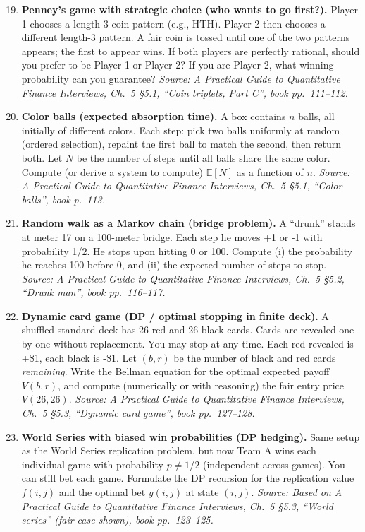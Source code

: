 \documentclass[11pt]{article}
\begin{document}
\begin{enumerate}[leftmargin=*, itemsep=0.9em]
\setcounter{enumi}{18}

\item \textbf{Penney's game with strategic choice (who wants to go first?).}  
Player 1 chooses a length-3 coin pattern (e.g., HTH). Player 2 then chooses a different length-3 pattern. A fair coin is tossed until one of the two patterns appears; the first to appear wins. If both players are perfectly rational, should you prefer to be Player 1 or Player 2? If you are Player 2, what winning probability can you guarantee?  
\textit{Source: A Practical Guide to Quantitative Finance Interviews, Ch.\ 5 \S5.1, ``Coin triplets, Part C'', book pp.\ 111--112.}

\item \textbf{Color balls (expected absorption time).}  
A box contains $n$ balls, all initially of different colors. Each step: pick two balls uniformly at random (ordered selection), repaint the first ball to match the second, then return both. Let $N$ be the number of steps until all balls share the same color. Compute (or derive a system to compute) $\mathbb{E}[N]$ as a function of $n$.  
\textit{Source: A Practical Guide to Quantitative Finance Interviews, Ch.\ 5 \S5.1, ``Color balls'', book p.\ 113.}

\item \textbf{Random walk as a Markov chain (bridge problem).}  
A ``drunk'' stands at meter 17 on a 100-meter bridge. Each step he moves +1 or -1 with probability 1/2. He stops upon hitting 0 or 100. Compute (i) the probability he reaches 100 before 0, and (ii) the expected number of steps to stop.  
\textit{Source: A Practical Guide to Quantitative Finance Interviews, Ch.\ 5 \S5.2, ``Drunk man'', book pp.\ 116--117.}

\item \textbf{Dynamic card game (DP / optimal stopping in finite deck).}  
A shuffled standard deck has 26 red and 26 black cards. Cards are revealed one-by-one without replacement. You may stop at any time. Each red revealed is +\$1, each black is -\$1. Let $(b,r)$ be the number of black and red cards \emph{remaining}. Write the Bellman equation for the optimal expected payoff $V(b,r)$, and compute (numerically or with reasoning) the fair entry price $V(26,26)$.  
\textit{Source: A Practical Guide to Quantitative Finance Interviews, Ch.\ 5 \S5.3, ``Dynamic card game'', book pp.\ 127--128.}

\item \textbf{World Series with biased win probabilities (DP hedging).}  
Same setup as the World Series replication problem, but now Team A wins each individual game with probability $p\neq 1/2$ (independent across games). You can still bet each game. Formulate the DP recursion for the replication value $f(i,j)$ and the optimal bet $y(i,j)$ at state $(i,j)$.  
\textit{Source: Based on A Practical Guide to Quantitative Finance Interviews, Ch.\ 5 \S5.3, ``World series'' (fair case shown), book pp.\ 123--125.}


\end{enumerate}
\end{document}
